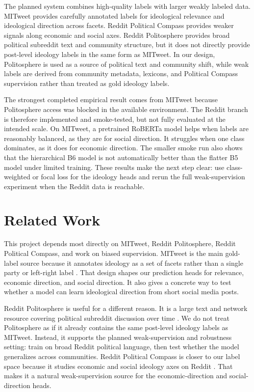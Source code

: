 \documentclass[11pt,twocolumn]{article}
\begin{document}
The planned system combines high-quality labels with larger weakly labeled data. MITweet provides carefully annotated labels for ideological relevance and ideological direction across facets. Reddit Political Compass provides weaker signals along economic and social axes. Reddit Politosphere provides broad political subreddit text and community structure, but it does not directly provide post-level ideology labels in the same form as MITweet. In our design, Politosphere is used as a source of political text and community shift, while weak labels are derived from community metadata, lexicons, and Political Compass supervision rather than treated as gold ideology labels.

The strongest completed empirical result comes from MITweet because Politosphere access was blocked in the available environment. The Reddit branch is therefore implemented and smoke-tested, but not fully evaluated at the intended scale. On MITweet, a pretrained RoBERTa model helps when labels are reasonably balanced, as they are for social direction. It struggles when one class dominates, as it does for economic direction. The smaller smoke run also shows that the hierarchical B6 model is not automatically better than the flatter B5 model under limited training. These results make the next step clear: use class-weighted or focal loss for the ideology heads and rerun the full weak-supervision experiment when the Reddit data is reachable.

\section{Related Work}

This project depends most directly on MITweet, Reddit Politosphere, Reddit Political Compass, and work on biased supervision. MITweet is the main gold-label source because it annotates ideology as a set of facets rather than a single party or left-right label \cite{liu-etal-2023-ideology}. That design shapes our prediction heads for relevance, economic direction, and social direction. It also gives a concrete way to test whether a model can learn ideological direction from short social media posts.

Reddit Politosphere is useful for a different reason. It is a large text and network resource covering political subreddit discussion over time \cite{hofmann-etal-2022-politosphere}. We do not treat Politosphere as if it already contains the same post-level ideology labels as MITweet. Instead, it supports the planned weak-supervision and robustness setting: train on broad Reddit political language, then test whether the model generalizes across communities. Reddit Political Compass is closer to our label space because it studies economic and social ideology axes on Reddit \cite{colacrai-etal-2024-politicalcompass}. That makes it a natural weak-supervision source for the economic-direction and social-direction heads.
\end{document}
